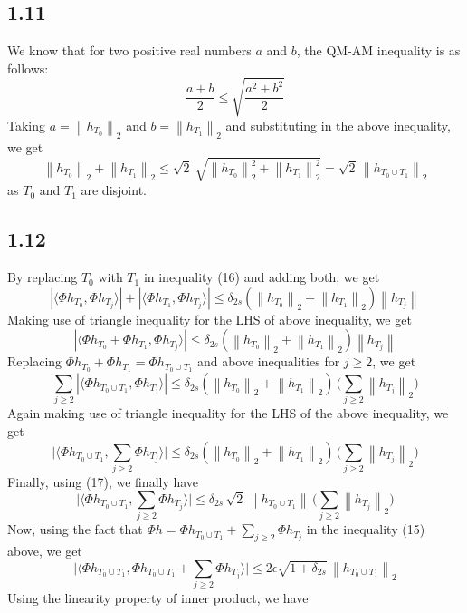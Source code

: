 \documentclass[12pt]{article}
\newcommand{\norm}[1]{\left\lVert #1 \right\rVert}
\begin{document}
\subsection*{1.11}
We know that for two positive real numbers $a$ and $b$, the QM-AM inequality is as follows:
$$\frac{a + b}{2} \leq \sqrt{\frac{a^2 + b^2}{2}}$$
Taking $a = \norm{h_{T_0}}_2$ and $b = \norm{h_{T_1}}_2$ and substituting in the above inequality, we get
\begin{equation}
\norm{h_{T_0}}_2 + \norm{h_{T_1}}_2 \leq \sqrt{2} \:\sqrt{\norm{h_{T_0}}_2^2 + \norm{h_{T_1}}_2^2} = \sqrt{2}\, \norm{h_{T_0 \cup T_1}}_2
\end{equation}
as $T_0$ and $T_1$ are disjoint.
\subsection*{1.12}
By replacing $T_0$ with $T_1$ in inequality (16) and adding both, we get
$$|\langle \Phi h_{T_0}, \Phi h_{T_j}\rangle | + |\langle \Phi h_{T_1}, \Phi h_{T_j}\rangle | \leq \delta_{2s} (\norm{h_{T_0}}_2 + \norm{h_{T_1}}_2) \norm{h_{T_{j}}}$$
Making use of triangle inequality for the LHS of above inequality, we get
$$|\langle \Phi h_{T_0} + \Phi h_{T_1}, \Phi h_{T_j}\rangle | \leq \delta_{2s} (\norm{h_{T_0}}_2 + \norm{h_{T_1}}_2) \norm{h_{T_{j}}}$$
Replacing $\Phi h_{T_0} + \Phi h_{T_1} = \Phi h_{T_0 \cup T_1}$ and above inequalities for $j \geq 2$, we get
$$\sum \limits_{j \geq 2} |\langle \Phi h_{T_0 \cup T_1}, \Phi h_{T_j}\rangle |\leq \delta_{2s} (\norm{h_{T_0}}_2 + \norm{h_{T_1}}_2) \, \bigg(\sum \limits_{j \geq 2} \norm{h_{T_j}}_2\bigg)$$
Again making use of triangle inequality for the LHS of the above inequality, we get
$$\bigg|\bigg\langle \Phi h_{T_0 \cup T_1}, \sum_{j \geq 2} \Phi h_{T_j}\bigg\rangle \bigg| \leq \delta_{2s} (\norm{h_{T_0}}_2 + \norm{h_{T_1}}_2) \, \bigg(\sum \limits_{j \geq 2} \norm{h_{T_j}}_2\bigg)$$
Finally, using (17), we finally have
\begin{equation}
\bigg|\bigg\langle \Phi h_{T_0 \cup T_1}, \sum_{j \geq 2} \Phi h_{T_j}\bigg\rangle \bigg| \leq \delta_{2s} \, \sqrt{2}\,\norm{h_{T_0 \cup T_1}} \, \bigg(\sum \limits_{j \geq 2} \norm{h_{T_j}}_2\bigg)
\end{equation}
Now, using the fact that $\Phi h = \Phi h_{T_0 \cup T_1} + \sum_{j \geq 2} \Phi h_{T_j}$ in the inequality (15) above, we get
$$\bigg|\bigg\langle \Phi h_{T_0 \cup T_1}, \Phi h_{T_0 \cup T_1} + \sum_{j \geq 2} \Phi h_{T_j}\bigg\rangle \bigg| \leq 	2\epsilon \sqrt{1 + \delta_{2s}} \, \norm{ h_{T_0 \cup T_1}}_2$$
Using the linearity property of inner product, we have
\end{document}
